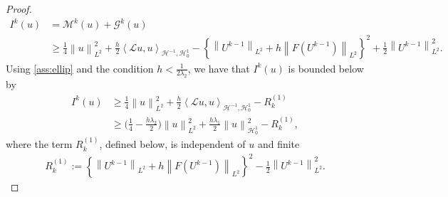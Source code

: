 \documentclass[11pt,a4paper,reqno]{amsart}
\numberwithin{equation}{section}
\theoremstyle{plain}
\theoremstyle{definition}
\newcommand{\ip}[1]{\left\langle#1\right\rangle}
\newcommand{\cL}{\mathcal{L}}
\newcommand{\cH}{\mathcal{H}}
\newcommand{\norm}[1]{\left\|#1 \right\|} %
\begin{document}
\begin{proof}
\begin{align*}
I^k (u) 
    &= \mathcal{M}^k (u) + \mathcal{G}^k (u) \\ 
    &\ge \frac{1}{4} \norm{u}^2_{L^2} + \frac{h}{2} \ip{\cL  u,  u}_{\cH^{-1},\cH_0^1} - \left\{ \norm{U^{k - 1}}_{L^2} + h \norm{F \left( U^{k - 1} \right)}_{L^2} \right\} ^2 + \frac{1}{2} \norm{U^{k - 1}}^2_{L^2}.
\end{align*}
Using \cref{ass:ellip} and the condition $h<\frac{1}{2\lambda_2}$, we have that $I^k (u)$ is bounded below by 
\begin{align}\label{eq:Ik-bound}
I^k (u) 
    &\ge \frac{1}{4} \norm{u}^2_{L^2} + \frac{h}{2} \ip{\cL  u,  u}_{\cH^{-1},\cH_0^1} - R^{\left( 1 \right)}_k \nonumber\\
    &\ge  \Big(\frac{1}{4}-\frac{h \lambda_2}{2}\Big) \norm{u}^2_{L^2} + \frac{h\lambda_1}{2} \norm{u}^2_{\cH_0^1} - R^{\left( 1 \right)}_k,
\end{align}
where the term $R_k^{(1)}$, defined below, is independent of $u$ and finite
\begin{align}\label{eq:jnw}
R^{\left( 1 \right)}_k := \left\{ \norm{U^{k - 1}}_{L^2} + h\norm{F \left( U^{k - 1} \right)}_{L^2} \right\} ^2 - \frac{1}{2} \norm{U^{k - 1}}^2_{L^2}. 
\end{align}


\end{proof}
\end{document}
